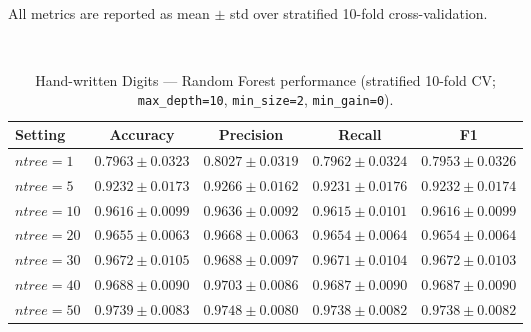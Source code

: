 \documentclass{article}
\begin{document}

 \
\vspace{0.5cm}

\noindent All metrics are reported as mean $\pm$ std over stratified 10-fold cross-validation.
\vspace{0.5cm}

\\

\begin{table}[H]
\centering
\small
\caption{Hand-written Digits --- Random Forest performance (stratified 10-fold CV; \texttt{max\_depth=10}, \texttt{min\_size=2}, \texttt{min\_gain=0}).}
\label{tab:digits-rf}
\begin{tabular}{@{}lcccc@{}}
\toprule
Setting & Accuracy & Precision & Recall & F1 \\
\midrule
$\mathit{ntree}=1$  & $0.7963 \pm 0.0323$ & $0.8027 \pm 0.0319$ & $0.7962 \pm 0.0324$ & $0.7953 \pm 0.0326$ \\
$\mathit{ntree}=5$  & $0.9232 \pm 0.0173$ & $0.9266 \pm 0.0162$ & $0.9231 \pm 0.0176$ & $0.9232 \pm 0.0174$ \\
$\mathit{ntree}=10$ & $0.9616 \pm 0.0099$ & $0.9636 \pm 0.0092$ & $0.9615 \pm 0.0101$ & $0.9616 \pm 0.0099$ \\
$\mathit{ntree}=20$ & $0.9655 \pm 0.0063$ & $0.9668 \pm 0.0063$ & $0.9654 \pm 0.0064$ & $0.9654 \pm 0.0064$ \\
$\mathit{ntree}=30$ & $0.9672 \pm 0.0105$ & $0.9688 \pm 0.0097$ & $0.9671 \pm 0.0104$ & $0.9672 \pm 0.0103$ \\
$\mathit{ntree}=40$ & $0.9688 \pm 0.0090$ & $0.9703 \pm 0.0086$ & $0.9687 \pm 0.0090$ & $0.9687 \pm 0.0090$ \\
$\mathit{ntree}=50$ & $\mathbf{0.9739 \pm 0.0083}$ & $\mathbf{0.9748 \pm 0.0080}$ & $\mathbf{0.9738 \pm 0.0082}$ & $\mathbf{0.9738 \pm 0.0082}$ \\
\bottomrule
\end{tabular}
\end{table}
\end{document}
